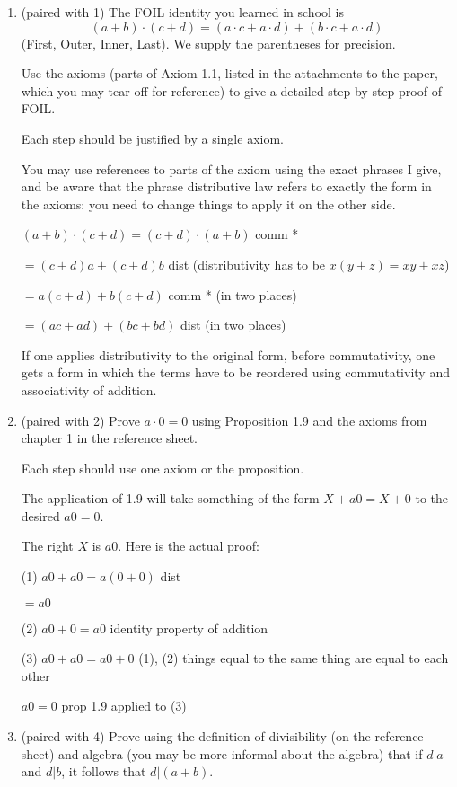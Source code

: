 \documentclass[12pt]{article}
\begin{document}
\begin{enumerate}

\item (paired with 1) The FOIL identity you learned in school is $$(a+b)\cdot(c+d) = (a\cdot c + a \cdot d) + (b \cdot c + a \cdot d)$$ (First, Outer, Inner, Last).  We supply the parentheses for precision.  

Use the axioms (parts of Axiom 1.1, listed in the attachments to the paper, which you may tear off for reference) to give a detailed step by step proof of FOIL.  

Each step should be justified by a single axiom.  

You may use references to parts of the axiom using the exact phrases I give, and be aware that the phrase distributive law refers to exactly the form in the axioms:  you need to change things to apply it on the other side.

$(a+b)\cdot(c+d) = (c+d) \cdot(a+b)$  comm *

$= (c+d)a + (c+d)b$  dist (distributivity has to be $x(y+z) = xy+xz$)

$=a(c+d) + b(c+d)$  comm * (in two places)

$=(ac +ad) + (bc + bd)$  dist (in two places)

If one applies distributivity to the original form, before commutativity, one gets a form in which the terms have to be reordered using commutativity and associativity of addition.

\newpage

\item  (paired with 2) Prove $a \cdot 0 = 0$ using Proposition 1.9 and the axioms from chapter 1 in the reference sheet.

Each step should use one axiom or the proposition.

The application of 1.9 will take something of the form $X + a0 = X +0$ to the desired $a0 = 0$.

The right $X$ is $a0$.  Here is the actual proof:

(1) $a0 + a0= a(0+0)$  dist

$=a0$

(2) $a0 + 0 = a0$  identity property of addition

(3)  $a0 + a0 = a0 +0$  (1), (2) things equal to the same thing are equal to each other

$a0 =0$ prop 1.9 applied to (3)

\newpage

\item (paired with 4)  Prove using the definition of divisibility (on the reference sheet) and algebra (you may be more informal about the algebra) that if $d|a$ and $d|b$, it follows that $d|(a+b)$.


\end{enumerate}
\end{document}
